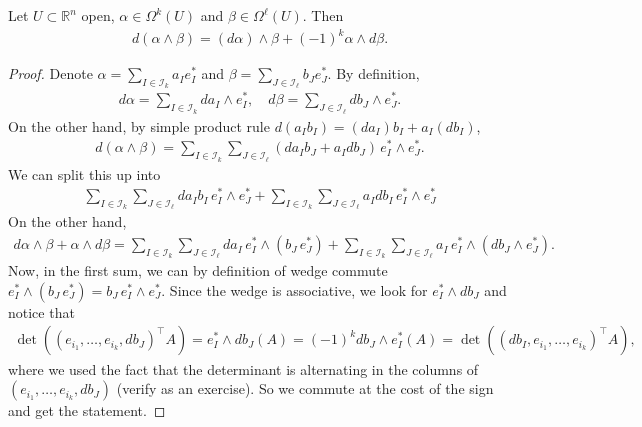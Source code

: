 
\begin{lemma}\label{lem:leibniz}
	Let $U \subset \mathbb{R}^{n}$ open, $\alpha  \in \Omega^{k}(U)$ and $\beta  \in \Omega^{\ell}(U)$. Then
	\begin{align*}
		d(\alpha \wedge \beta ) = (d\alpha) \wedge \beta + (-1)^{k} \alpha \wedge d\beta.
	\end{align*}
\end{lemma}
\begin{proof}
	Denote $\alpha = \sum_{I \in \mathcal{I}_{k}} a_{I} e_{I}^*$ and $\beta = \sum_{J \in \mathcal{I}_{\ell}} b_{J} e_{J}^*$. By definition,
	\begin{align*}
		d\alpha = \sum_{I \in \mathcal{I}_{k}} d a_{I} \wedge e_{I}^*, \quad d \beta = \sum_{J \in \mathcal{I}_{\ell}} d b_{J} \wedge e_{J}^*.
	\end{align*}
	On the other hand, by simple product rule $d(a_{I} b_{I}) = (da_{I}) b_{I} + a_{I} (db_{I})$,
	\begin{align*}
		d(\alpha \wedge \beta ) = \sum_{I \in \mathcal{I}_{k}} \sum_{J \in \mathcal{I}_{\ell}} (d a_{I} b_{J} + a_{I} db_{J}) \, e_{I}^* \wedge e_{J}^*.
	\end{align*}
	We can split this up into
	\begin{align*}
		\sum_{I \in \mathcal{I}_{k}} \sum_{J \in \mathcal{I}_{\ell}} d a_{I} b_{I} \, e_{I}^* \wedge e_{J}^* +
		\sum_{I \in \mathcal{I}_{k}} \sum_{J \in \mathcal{I}_{\ell}} a_{I} d b_{I} \, e_{I}^* \wedge e_{J}^*
	\end{align*}
	On the other hand,
	\begin{align*}
		d\alpha \wedge \beta + \alpha \wedge d\beta = \sum_{I \in \mathcal{I}_{k}} \sum_{J \in \mathcal{I}_{\ell}} da_{I} \,e_{I}^* \wedge (b_{J}\, e_{J}^*)  + \sum_{I \in \mathcal{I}_{k}} \sum_{J \in \mathcal{I}_{\ell}} a_{I}\, e_{I}^* \wedge (db_{J} \wedge e_{J}^*).
	\end{align*}
	Now, in the first sum, we can by definition of wedge commute $e_{I}^* \wedge (b_{J} \, e_{J}^*) = b_{J}\, e_{I}^* \wedge e_{J}^*$. Since the wedge is associative, we look for $e_{I}^* \wedge db_{J}$ and notice that
	\begin{align*}
		\det ((e_{i_{1}}, \dots, e_{i_{k}}, db_{J})^\top  A) = e_{I}^* \wedge db_{J}(A) = (-1)^{k} db_{J} \wedge e_{I}^*(A) = \det ((db_{I}, e_{i_{1}}, \dots, e_{i_{k}})^\top A),
	\end{align*}
	where we used the fact that the determinant is alternating in the columns of $(e_{i_{1}}, \dots, e_{i_{k}}, db_{J})$ (verify as an exercise). So we commute at the cost of the sign and get the statement.
\end{proof}

